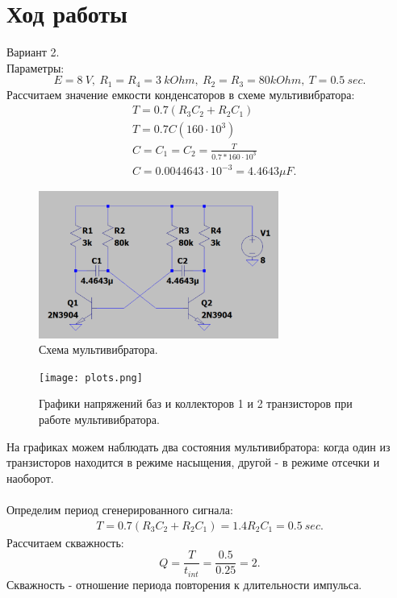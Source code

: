 \documentclass[12pt]{article}
\begin{document}
\section*{Ход работы}
Вариант 2.\\
Параметры:
\[
    E = 8 \ V, \ R_1 = R_4 = 3 \ kOhm,\ R_2 = R_3 = 80 kOhm, \ T = 0.5 \ sec.
\]
Рассчитаем значение емкости конденсаторов в схеме мультивибратора:
\[
    \begin{split}
        & T = 0.7(R_3C_2 + R_2C_1) \\
        & T = 0.7C(160\cdot 10^3) \\
        & C = C_1 = C_2 = \frac{T}{0.7*160\cdot 10^3} \\
        & C = 0.0044643 \cdot 10^{-3} = 4.4643 \mu F.
    \end{split}
\]
\begin{figure}[H]
    \centering
    \includegraphics[width=0.7\textwidth]{scheme.png}
    \caption{Схема мультивибратора.}
    \label{fig:scheme}
\end{figure}

\begin{figure}[H]
    \centering
    \texttt{[image: plots.png]}
    \caption{Графики напряжений баз и коллекторов 1 и 2 транзисторов при работе мультивибратора.}
    \label{fig:plots}
\end{figure}
На графиках можем наблюдать два состояния мультивибратора: когда один из транзисторов находится в режиме насыщения, другой - в режиме отсечки и наоборот. \\
\ \\
Определим период сгенерированного сигнала:
\[
    \begin{split}
        T = 0.7(R_3C_2 + R_2C_1) = 1.4R_2C_1 = 0.5 \ sec.
    \end{split}
\]
Рассчитаем скважность:
\[
    Q = \frac{T}{t_{int}} = \frac{0.5}{0.25} = 2.
\]
Скважность - отношение периода повторения к длительности импульса.
\end{document}

